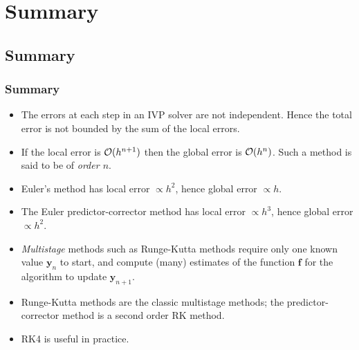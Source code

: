 \documentclass{beamer}
\newcommand{\by}{{\boldsymbol{y}}}
\newcommand{\bfm}[1]{{\boldsymbol{#1}}}
\begin{document}
\section{Summary}

\subsection{Summary}

\begin{frame}
  \frametitle{Summary}

  \begin{itemize}
  \item The errors at each step in an IVP solver are not independent.
    Hence the total error is not bounded by the sum of the local
    errors.
  \item If the local error is ${\cal O}(h^{n+1})$ then the global
    error is ${\cal O}(h^{n})$. Such a method is said to be of
    \emph{order $n$}.
  \item Euler's method has local error $\propto h^2$, hence global
    error $\propto h$.
  \item The Euler predictor-corrector method has local error $\propto
    h^3$, hence global error $\propto h^2$.
  \item \emph{Multistage} methods such as Runge-Kutta methods require
    only one known value $\by_{n}$ to start, and compute (many)
    estimates of the function $\bfm{f}$ for the algorithm to update
    $\by_{n+1}$.
  \item Runge-Kutta methods are the classic multistage methods; the
    predictor-corrector method is a second order RK method.
  \item RK4 is useful in practice.
  \end{itemize}

\end{frame}
\end{document}
